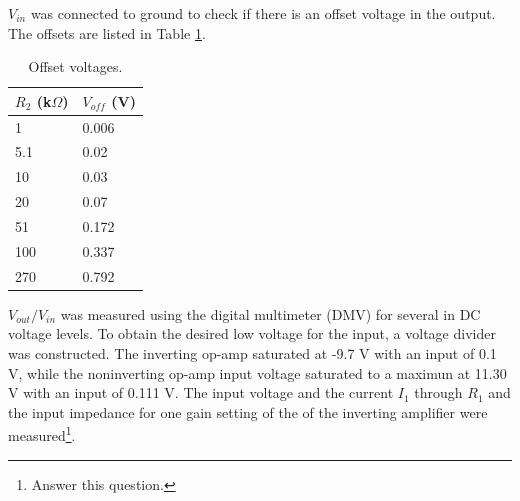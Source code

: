 \documentclass[11pt,onecolumn]{article}
\begin{document}
$V_{in}$ was connected to ground to check if there is an offset voltage in the output. The offsets are listed in Table \ref{tab:Q2}.

\begin{table}
\center
\begin{tabular}{|ll|}
\hline
$R_2$ (k$\Omega$)	& $V_{off}$ (V) \\
\hline
1			& 0.006 \\
5.1			& 0.02 \\
10			& 0.03 \\
20			& 0.07 \\
51			& 0.172 \\
100			& 0.337 \\
270			& 0.792 \\
\hline
\end{tabular}
\caption{Offset voltages.}\label{tab:Q2}
\end{table}

$V_{out} / V_{in}$ was measured using the digital multimeter (DMV) for several in DC voltage levels. To obtain the desired low voltage for the input, a voltage divider was constructed. The inverting op-amp saturated at -9.7 V with an input of  0.1 V, while the noninverting op-amp input voltage saturated to a maximun at 11.30 V with an input of 0.111 V. The input voltage and the current $I_1$ through $R_1$ and the input impedance for one gain setting of the of the inverting amplifier were measured\footnote{Answer this question.}.
\end{document}
